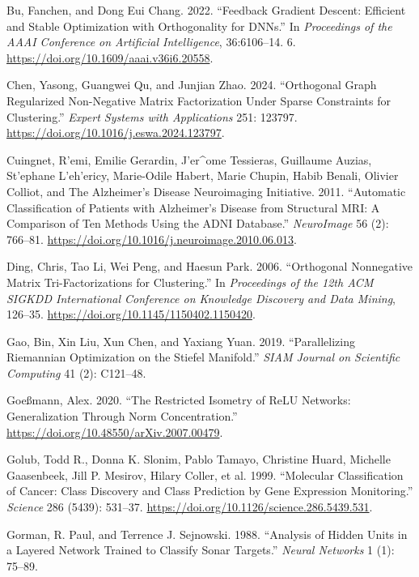 \documentclass[
]{article}
\newlength{\cslhangindent}
\newenvironment{CSLReferences}[2] %
 {\begin{list}{}{%
  \setlength{\itemindent}{0pt}
  \setlength{\leftmargin}{0pt}
  \setlength{\parsep}{0pt}
  \ifodd #1
   \setlength{\leftmargin}{\cslhangindent}
   \setlength{\itemindent}{-1\cslhangindent}
  \fi
  \setlength{\itemsep}{#2\baselineskip}}}
 {\end{list}}
\begin{document}
\begin{CSLReferences}{1}{0}
Bu, Fanchen, and Dong Eui Chang. 2022. {``Feedback Gradient Descent: Efficient and Stable Optimization with Orthogonality for DNNs.''} In \emph{Proceedings of the AAAI Conference on Artificial Intelligence}, 36:6106--14. 6. \url{https://doi.org/10.1609/aaai.v36i6.20558}.

Chen, Yasong, Guangwei Qu, and Junjian Zhao. 2024. {``Orthogonal Graph Regularized Non-Negative Matrix Factorization Under Sparse Constraints for Clustering.''} \emph{Expert Systems with Applications} 251: 123797. \url{https://doi.org/10.1016/j.eswa.2024.123797}.

Cuingnet, R'emi, Emilie Gerardin, J'er\^{}ome Tessieras, Guillaume Auzias, St'ephane L'eh'ericy, Marie-Odile Habert, Marie Chupin, Habib Benali, Olivier Colliot, and The Alzheimer's Disease Neuroimaging Initiative. 2011. {``Automatic Classification of Patients with Alzheimer's Disease from Structural {MRI}: A Comparison of Ten Methods Using the {ADNI} Database.''} \emph{NeuroImage} 56 (2): 766--81. \url{https://doi.org/10.1016/j.neuroimage.2010.06.013}.

Ding, Chris, Tao Li, Wei Peng, and Haesun Park. 2006. {``Orthogonal Nonnegative Matrix Tri-Factorizations for Clustering.''} In \emph{Proceedings of the 12th ACM SIGKDD International Conference on Knowledge Discovery and Data Mining}, 126--35. \url{https://doi.org/10.1145/1150402.1150420}.

Gao, Bin, Xin Liu, Xun Chen, and Yaxiang Yuan. 2019. {``Parallelizing Riemannian Optimization on the Stiefel Manifold.''} \emph{SIAM Journal on Scientific Computing} 41 (2): C121--48.

Goeßmann, Alex. 2020. {``The Restricted Isometry of ReLU Networks: Generalization Through Norm Concentration.''} \url{https://doi.org/10.48550/arXiv.2007.00479}.

Golub, Todd R., Donna K. Slonim, Pablo Tamayo, Christine Huard, Michelle Gaasenbeek, Jill P. Mesirov, Hilary Coller, et al. 1999. {``Molecular Classification of Cancer: Class Discovery and Class Prediction by Gene Expression Monitoring.''} \emph{Science} 286 (5439): 531--37. \url{https://doi.org/10.1126/science.286.5439.531}.

Gorman, R. Paul, and Terrence J. Sejnowski. 1988. {``Analysis of Hidden Units in a Layered Network Trained to Classify Sonar Targets.''} \emph{Neural Networks} 1 (1): 75--89.


\end{CSLReferences}
\end{document}
